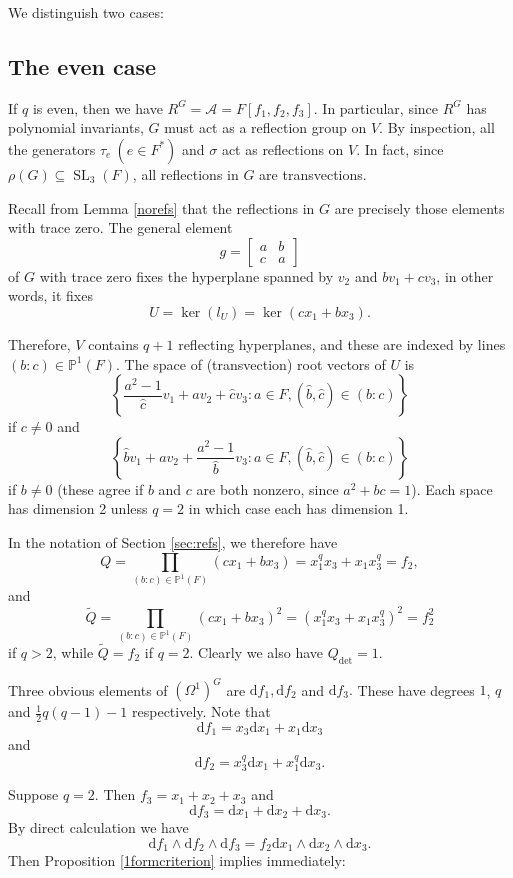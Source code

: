 \documentclass[a4paper]{amsart}
\newcommand{\dd}{\mathrm{d}}
\def\SL{\operatorname{SL}}
\newtheorem*{Corollary of Conjecture}{Corollary of Conjecture}
\theoremstyle{definition}
\theoremstyle{remark}
\theoremstyle{Acknowledgments}
\begin{document}
We distinguish two cases:

\subsection{The even case}\label{sec:even}

If $q$ is even, then we have $R^G= \mathcal{A} = F[f_1,f_2,f_3]$. In particular, since $R^G$ has polynomial invariants, $G$ must act as a reflection group on $V$. By inspection, all the generators $\tau_e \ (e \in F^*)$ and $\sigma$ act as reflections on $V$. In fact, since $\rho(G) \subseteq \SL_3(F)$, all reflections in $G$ are transvections.

Recall from Lemma \ref{norefs} that the reflections in $G$ are precisely those elements with trace zero. The general element
\[g =\begin{bmatrix} a & b\\ c& a \end{bmatrix}\] of $G$ with trace zero fixes the hyperplane spanned by $v_2$ and $bv_1+cv_3$, in other words, it fixes $$U = \ker(l_{U}) = \ker(cx_1+bx_3).$$

Therefore, $V$ contains $q+1$ reflecting hyperplanes, and these are indexed by lines $(b:c) \in \mathbb{P}^1(F)$. The space of (transvection) root vectors of $U$ is
\[\left\{\frac{a^2-1}{\hat{c}}v_1+av_2+\hat{c}v_3: a \in F, (\hat{b},\hat{c}) \in (b:c)\right\}\] if $c \neq 0$ and
\[\left\{\hat{b}v_1+av_2+\frac{a^2-1}{\hat{b}}v_3: a \in F, (\hat{b},\hat{c}) \in (b:c)\right\}\] if $b \neq 0$ (these agree if $b$ and $c$ are both nonzero, since $a^2+bc=1$). Each space has dimension 2 unless $q=2$ in which case each has dimension 1.

In the notation of Section \ref{sec:refs}, we therefore have
\[Q = \prod_{(b:c) \in \mathbb{P}^1(F)}(cx_1+bx_3) = x_1^qx_3+x_1x_3^q = f_2,\]
and
\[\tilde{Q} =  \prod_{(b:c) \in \mathbb{P}^1(F)}(cx_1+bx_3)^2 = (x_1^qx_3+x_1x_3^q)^2 = f^2_2\]
if $q>2$, while $\tilde{Q} = f_2$ if $q=2$. Clearly we also have $Q_{\det}=1$.


Three obvious elements of $(\Omega^1)^G$ are $\dd f_1, \dd f_2$ and $\dd f_3.$ These have degrees $1$, $q$ and $\frac12 q(q-1)-1$  respectively. Note that
\[\dd f_1 = x_3 \dd x_1+ x_1 \dd x_3\]
and
\[\dd f_2 = x_3^q \dd x_1+ x_1^q \dd x_3.\]

Suppose $q=2$. Then $f_3 = x_1+x_2+x_3$ and 
\begin{equation}\label{df3q2}\dd f_3 = \dd x_1+\dd x_2+ \dd x_3.\end{equation}
By direct calculation we have
\[\dd f_1 \wedge \dd f_2 \wedge \dd f_3 = f_2 \dd x_1 \wedge \dd x_2 \wedge \dd x_3.\] Then Proposition \ref{1formcriterion} implies immediately:
\end{document}
